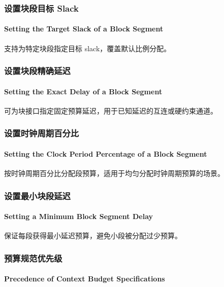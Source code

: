 \subsubsection{设置块段目标 Slack}
\paragraph*{Setting the Target Slack of a Block Segment}

 支持为特定块段指定目标 slack，覆盖默认比例分配。

\subsubsection{设置块段精确延迟}
\paragraph*{Setting the Exact Delay of a Block Segment}

可为块接口指定固定预算延迟，用于已知延迟的互连或硬约束通道。

\subsubsection{设置时钟周期百分比}
\paragraph*{Setting the Clock Period Percentage of a Block Segment}

按时钟周期百分比分配段预算，适用于均匀分配时钟周期预算的场景。

\subsubsection{设置最小块段延迟}
\paragraph*{Setting a Minimum Block Segment Delay}

保证每段获得最小延迟预算，避免小段被分配过少预算。

\subsubsection{预算规范优先级}
\paragraph*{Precedence of Context Budget Specifications}

